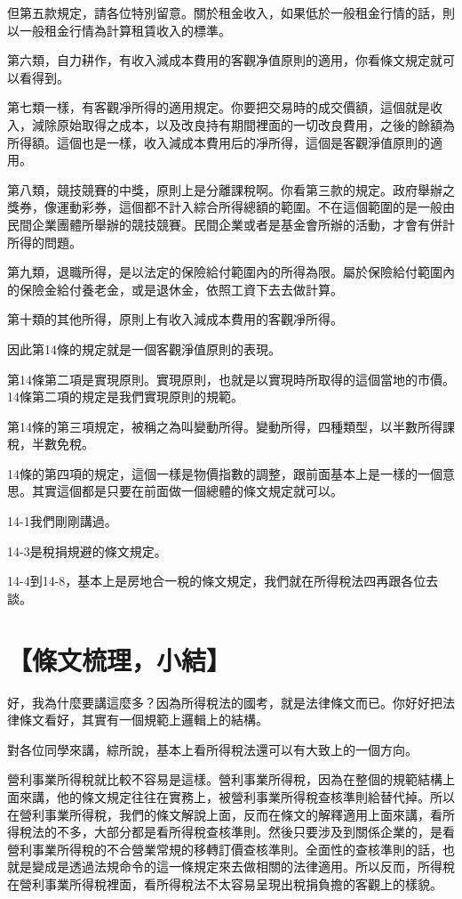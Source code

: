 \documentclass[]{ctexbook}
\begin{document}
但第五款規定，請各位特別留意。關於租金收入，如果低於一般租金行情的話，則以一般租金行情為計算租賃收入的標準。

第六類，自力耕作，有收入減成本費用的客觀净值原則的適用，你看條文規定就可以看得到。

第七類一樣，有客觀凈所得的適用規定。你要把交易時的成交價額，這個就是收入，減除原始取得之成本，以及改良持有期間裡面的一切改良費用，之後的餘額為所得額。這個也是一樣，收入減成本費用后的凈所得，這個是客觀淨值原則的適用。

第八類，競技競賽的中獎，原則上是分離課稅啊。你看第三款的規定。政府舉辦之獎券，像運動彩券，這個都不計入綜合所得總額的範圍。不在這個範圍的是一般由民間企業團體所舉辦的競技競賽。民間企業或者是基金會所辦的活動，才會有併計所得的問題。

第九類，退職所得，是以法定的保險給付範圍內的所得為限。屬於保險給付範圍內的保險金給付養老金，或是退休金，依照工資下去去做計算。

第十類的其他所得，原則上有收入減成本費用的客觀凈所得。

因此第14條的規定就是一個客觀淨值原則的表現。

第14條第二項是實現原則。實現原則，也就是以實現時所取得的這個當地的市價。14條第二項的規定是我們實現原則的規範。

第14條的第三項規定，被稱之為叫變動所得。變動所得，四種類型，以半數所得課稅，半數免稅。

14條的第四項的規定，這個一樣是物價指數的調整，跟前面基本上是一樣的一個意思。其實這個都是只要在前面做一個總體的條文規定就可以。

14-1我們剛剛講過。

14-3是稅捐規避的條文規定。

14-4到14-8，基本上是房地合一稅的條文規定，我們就在所得稅法四再跟各位去談。

\hypertarget{ux689dux6587ux68b3ux7406ux5c0fux7d50}{%
\section{【條文梳理，小結】}\label{ux689dux6587ux68b3ux7406ux5c0fux7d50}}

好，我為什麼要講這麼多？因為所得稅法的國考，就是法律條文而已。你好好把法律條文看好，其實有一個規範上邏輯上的結構。

對各位同學來講，綜所說，基本上看所得稅法還可以有大致上的一個方向。

營利事業所得稅就比較不容易是這樣。營利事業所得稅，因為在整個的規範結構上面來講，他的條文規定往往在實務上，被營利事業所得稅查核準則給替代掉。所以在營利事業所得稅，我們的條文解說上面，反而在條文的解釋適用上面來講，看所得稅法的不多，大部分都是看所得稅查核準則。然後只要涉及到關係企業的，是看營利事業所得稅的不合營業常規的移轉訂價查核準則。全面性的查核準則的話，也就是變成是透過法規命令的這一條規定來去做相關的法律適用。所以反而，所得稅在營利事業所得稅裡面，看所得稅法不太容易呈現出稅捐負擔的客觀上的樣貌。
\end{document}
